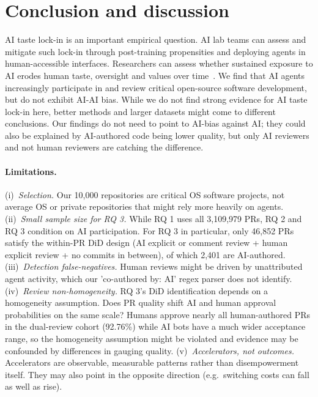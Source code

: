 \documentclass{article}
\begin{document}
\section{Conclusion and discussion}
\label{sec:discuss}

AI taste lock-in is an important empirical question. AI lab teams can assess and mitigate such lock-in through post-training propensities and deploying agents in human-accessible interfaces. Researchers can assess whether sustained exposure to AI erodes human taste, oversight and values over time~\citep{edelman2025fullstack}.
We find that AI agents increasingly participate in and review critical open-source software development, but do not exhibit AI-AI bias. While we do not find strong evidence for AI taste lock-in here, better methods and larger datasets might come to different conclusions. Our findings do not need to point to AI-bias against AI; they could also be explained by AI-authored code being lower quality, but only AI reviewers and not human reviewers are catching the difference.

\paragraph{Limitations.} (i)~\emph{Selection.} Our 10,000{} repositories are critical OS software projects, not average OS or private repositories that might rely more heavily on agents.
(ii)~\emph{Small sample size for RQ 3.} While RQ 1 uses all 3,109,979{} PRs, RQ 2 and RQ 3 condition on AI participation. For RQ 3 in particular, only 46,852{} PRs satisfy the within-PR DiD design (AI explicit or comment review + human explicit review + no commits in between), of which 2,401{} are AI-authored.
(iii)~\emph{Detection false-negatives.} Human reviews might be driven by unattributed agent activity, which our 'co-authored by: AI' regex parser does not identify.
(iv)~\emph{Review non-homogeneity.} RQ 3's DiD identification depends on a homogeneity assumption. Does PR quality shift AI and human approval probabilities on the same scale? Humans approve nearly all human-authored PRs in the dual-review cohort (92.76\%{}) while AI bots have a much wider acceptance range, so the homogeneity assumption might be violated and evidence may be confounded by differences in gauging quality.
(v)~\emph{Accelerators, not outcomes.} Accelerators are observable, measurable patterns rather than disempowerment itself. They may also point in the opposite direction (e.g.\ switching costs can fall as well as rise).
\end{document}
